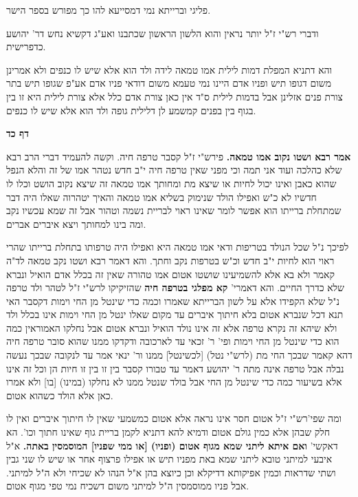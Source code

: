 \documentclass[12pt, openany]{book}
\newcommand{\sethebfont}{
\fontsize{10.5pt}{21.0pt} \selectfont
}
\newcommand{\twocol}[1]{
	{\sethebfont \begin{multicols}{2}
			#1
	\end{multicols}}	
}
\newcommand{\sectname}{}
\newcommand{\newsection}[1]{
	\addcontentsline{toc}{section}{#1}
	\renewcommand{\sectname}{#1}	
	\vspace{-\baselineskip}
	\begin{center}
		\textbf{%
\fontsize{16pt}{16pt}\selectfont
			#1}
	\end{center}
	\vspace{-\baselineskip}
	\nopagebreak
}
\begin{document}
{פליגי וברייתא נמי דמסייעא להו כך מפורש בספר הישר.\par  ודברי רש"י ז"ל יותר נראין והוא הלשון הראשון שכתבנו ואע"ג דקשיא נחש דר' יהושע כדפרישית.\par  והא דתניא המפלת דמות לילית אמו טמאה לידה ולד הוא אלא שיש לו כנפים ולא אמרינן משום דגופו תיש ופניו אדם היינו נמי טעמא משום דודאי פניו אדם אע"פ שגופו תיש בתר צורת פנים אזלינן אבל בדמות לילית ס"ד אין כאן צורת אדם כלל אלא צורת לילית היא זו בין בגוף בין בפנים קמשמע לן דלילית גופה ולד הוא אלא שיש לו כנפים. }

\newsection{דף כד}
\twocol{\textbf{אמר רבא ושטו נקוב אמו טמאה.}  פירש"י ז"ל קסבר טרפה חיה. וקשה להעמיד דברי הרב רבא שלא כהלכה ועוד אני תמה וכי מפני שאין טרפה חיה י"ב חדש נטהר אמו של זה והלא הנפל שהוא כאבן ואינו יכול לחיות או שיצא מת ומחותך אמו טמאה זה שיצא נקוב הושט וכלו לו חדשיו לא כ"ש ואפילו הולד שנימוק בשליא אמו טמאה והאיך יטהרוה שאלו היה דבר שמתחלת ברייתו הוא אפשר לומר שאינו ראוי לבריית נשמה וטהור אבל זה שמא עכשיו נקב ומה בינו למחותך ויצא איברים אברים.\par לפיכך נ"ל שכל הנולד בטריפות ודאי אמו טמאה היא ואפילו היה טרפותו בתחלת ברייתו שהרי ראוי הוא לחיות י"ב חדש וכ"ש בטרפות נקב וחתך. והא דאמר רבא ושטו נקב טמאה לד"ה קאמר ולא בא אלא להשמיעינו שושטו אטום אמו טהורה שאין זה בכלל אדם הואיל ונברא שלא כדרך החיים. 
 והא דאמרי' \textbf{קא מפלגי בטרפה חיה}  שהזיקיקו לרש"י ז"ל לטהר ולד טרפה נ"ל שלא הקפידו אלא על לשון הברייתא שאמרו וכמה כדי שינטל מן החי וימות דקסבר האי תנא דכל שנברא אטום בלא חיתוך איברים עד מקום שאלו ינטל מן החי וימות אינו בכלל ולד ולא שיהא זה נקרא טרפה אלא זה אינו נולד הואיל ונברא אטום אבל נחלקו האמוראין כמה הוא כדי שינטל מן החי וימות ופי' ר' זכאי עד לארכובה ודקדקו ממנו שהוא סובר טרפה חיה דהא קאמר שבכך החי מת (לרש"י נטל) [לכשינטל] ממנו ור' ינאי אמר עד לנקובה שבכך נעשה נבלה אבל טרפה אינה מתה ר' יהושע דאמר עד טבורו קסבר בין זו בין זו חיות הן וכל זה אינו אלא בשיעור כמה כדי שינטל מן החי אבל בולד שנטל ממנו לא נחלקו (במינו) [בו] ולא אמרו כאן אלא הולד כשהוא אטום.\par  ומה שפי'רש"י ז"ל אטום חסר אינו נראה אלא אטום כמשמעי שאין לו חיתוך איברים ואין לו חלק שבהן אלא כמין גולם אטום ודמיא להא דתניא לקמן בריית גוף שאינו חתוך וכו'. 
 הא דאקשי' \textbf{ואם איתא ליתני שמא מגוף אטום (ופניו) [או ממי שפניו] המוסמסין באתה.}  א"ל איבעי למיתני טובא ליתני שמא באת מפניו תיש או אפילו פרצוף אחר או שיש לו שני גבין ושתי שדראות וכמין אפיקותא דדיקלא וכן כיוצא בהן א"ל הנהו לא שכיחי ולא ה"ל למיתני. אבל פניו ממוסמסין ה"ל למיתני משום דשכיח נמי טפי מגוף אטום. 
}
\end{document}
